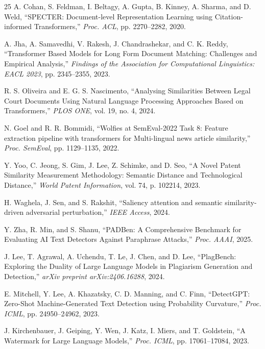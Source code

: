 \documentclass[conference,onecolumn,11pt]{IEEEtran}
\begin{document}
\begin{thebibliography}{25}
A. Cohan, S. Feldman, I. Beltagy, A. Gupta, B. Kinney, A. Sharma, and D. Weld, ``SPECTER: Document-level Representation Learning using Citation-informed Transformers,'' \textit{Proc. ACL}, pp. 2270--2282, 2020.

A. Jha, A. Samavedhi, V. Rakesh, J. Chandrashekar, and C. K. Reddy, ``Transformer Based Models for Long Form Document Matching: Challenges and Empirical Analysis,'' \textit{Findings of the Association for Computational Linguistics: EACL 2023}, pp. 2345--2355, 2023.

R. S. Oliveira and E. G. S. Nascimento, ``Analysing Similarities Between Legal Court Documents Using Natural Language Processing Approaches Based on Transformers,'' \textit{PLOS ONE}, vol. 19, no. 4, 2024.

N. Goel and R. R. Bommidi, ``Wolfies at SemEval-2022 Task 8: Feature extraction pipeline with transformers for Multi-lingual news article similarity,'' \textit{Proc. SemEval}, pp. 1129--1135, 2022.

Y. Yoo, C. Jeong, S. Gim, J. Lee, Z. Schimke, and D. Seo, ``A Novel Patent Similarity Measurement Methodology: Semantic Distance and Technological Distance,'' \textit{World Patent Information}, vol. 74, p. 102214, 2023.

H. Waghela, J. Sen, and S. Rakshit, ``Saliency attention and semantic similarity-driven adversarial perturbation,'' \textit{IEEE Access}, 2024.

Y. Zha, R. Min, and S. Shanu, ``PADBen: A Comprehensive Benchmark for Evaluating AI Text Detectors Against Paraphrase Attacks,'' \textit{Proc. AAAI}, 2025.

J. Lee, T. Agrawal, A. Uchendu, T. Le, J. Chen, and D. Lee, ``PlagBench: Exploring the Duality of Large Language Models in Plagiarism Generation and Detection,'' \textit{arXiv preprint arXiv:2406.16288}, 2024.

E. Mitchell, Y. Lee, A. Khazatsky, C. D. Manning, and C. Finn, ``DetectGPT: Zero-Shot Machine-Generated Text Detection using Probability Curvature,'' \textit{Proc. ICML}, pp. 24950--24962, 2023.

J. Kirchenbauer, J. Geiping, Y. Wen, J. Katz, I. Miers, and T. Goldstein, ``A Watermark for Large Language Models,'' \textit{Proc. ICML}, pp. 17061--17084, 2023.


\end{thebibliography}
\end{document}
